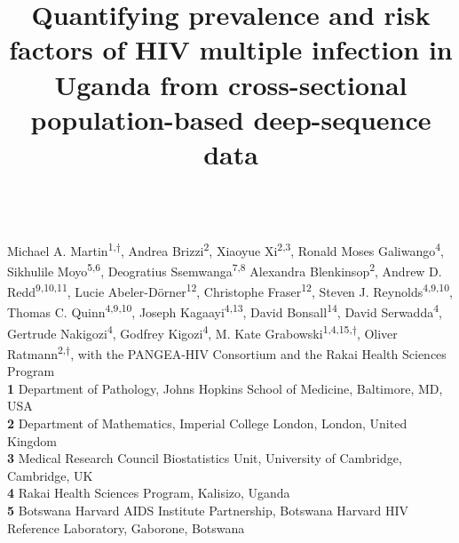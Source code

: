 \documentclass[10pt,letterpaper]{article}
\title{Quantifying prevalence and risk factors of HIV multiple infection in Uganda from cross-sectional population-based deep-sequence data}
\begin{document}

\begin{flushleft}

{\Large\textbf{} 
%
%
}
\newline
\\
Michael A. Martin\textsuperscript{1,$\dagger$},
Andrea Brizzi\textsuperscript{2},
Xiaoyue Xi\textsuperscript{2,3},
Ronald Moses Galiwango\textsuperscript{4},
Sikhulile Moyo\textsuperscript{5,6},
Deogratius Ssemwanga\textsuperscript{7,8}
Alexandra Blenkinsop\textsuperscript{2},
Andrew D. Redd\textsuperscript{9,10,11},
Lucie Abeler-Dörner\textsuperscript{12},
Christophe Fraser\textsuperscript{12},
Steven J. Reynolds\textsuperscript{4,9,10},
Thomas C. Quinn\textsuperscript{4,9,10},
Joseph Kagaayi\textsuperscript{4,13},
David Bonsall\textsuperscript{14},
David Serwadda\textsuperscript{4},
Gertrude Nakigozi\textsuperscript{4},
Godfrey Kigozi\textsuperscript{4},
M. Kate Grabowski\textsuperscript{1,4,15,$\dagger$},
Oliver Ratmann\textsuperscript{2,$\dagger$},
with the PANGEA-HIV Consortium and the Rakai Health Sciences Program
\\
\bigskip
\textbf{1} Department of Pathology, Johns Hopkins School of Medicine, Baltimore, MD, USA
\\
\textbf{2} Department of Mathematics, Imperial College London, London, United Kingdom
\\
\textbf{3} Medical Research Council Biostatistics Unit, University of Cambridge, Cambridge, UK \\

\textbf{4} Rakai Health Sciences Program, Kalisizo, Uganda \\

\textbf{5} Botswana Harvard AIDS Institute Partnership, Botswana Harvard HIV Reference Laboratory, Gaborone, Botswana \\


\end{flushleft}
\end{document}
